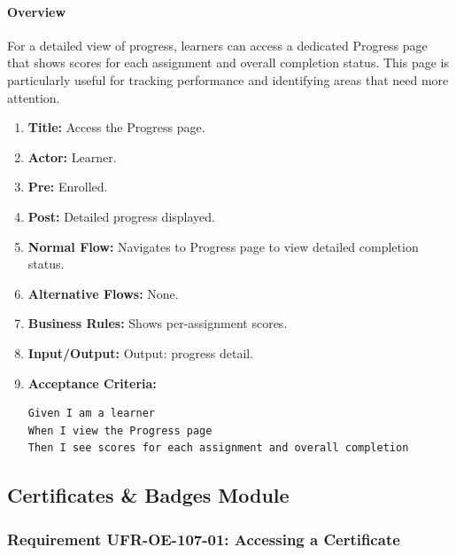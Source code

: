 \paragraph{Overview}
For a detailed view of progress, learners can access a dedicated Progress page that shows scores for each assignment and overall completion status. This page is particularly useful for tracking performance and identifying areas that need more attention.
\begin{enumerate}[label=\textbf{\arabic*.}]
\item \textbf{Title:} Access the Progress page.
\item \textbf{Actor:} Learner.
\item \textbf{Pre:} Enrolled.
\item \textbf{Post:} Detailed progress displayed.
\item \textbf{Normal Flow:} Navigates to Progress page to view detailed completion status.
\item \textbf{Alternative Flows:} None.
\item \textbf{Business Rules:} Shows per-assignment scores.
\item \textbf{Input/Output:} Output: progress detail.
\item \textbf{Acceptance Criteria:}
    \begin{verbatim}
Given I am a learner
When I view the Progress page
Then I see scores for each assignment and overall completion
    \end{verbatim}
\end{enumerate}

\subsection{Certificates \& Badges Module}
\subsubsection{Requirement UFR-OE-107-01: Accessing a Certificate}
